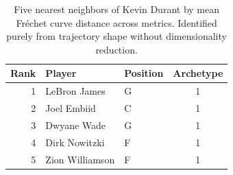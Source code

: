 \begin{table}[htbp]
  \centering\small
  \begin{tabular}{rllc}
    \toprule
    Rank & Player & Position & Archetype \\
    \midrule
    1 & LeBron James & G & 1 \\
    2 & Joel Embiid & C & 1 \\
    3 & Dwyane Wade & G & 1 \\
    4 & Dirk Nowitzki & F & 1 \\
    5 & Zion Williamson & F & 1 \\
    \bottomrule
  \end{tabular}
  \caption{Five nearest neighbors of Kevin Durant by mean Fr\'{e}chet curve distance across metrics. Identified purely from trajectory shape without dimensionality reduction.}
  \label{tab:Kevin_Durant_frechet_curve_neighbors}
\end{table}

